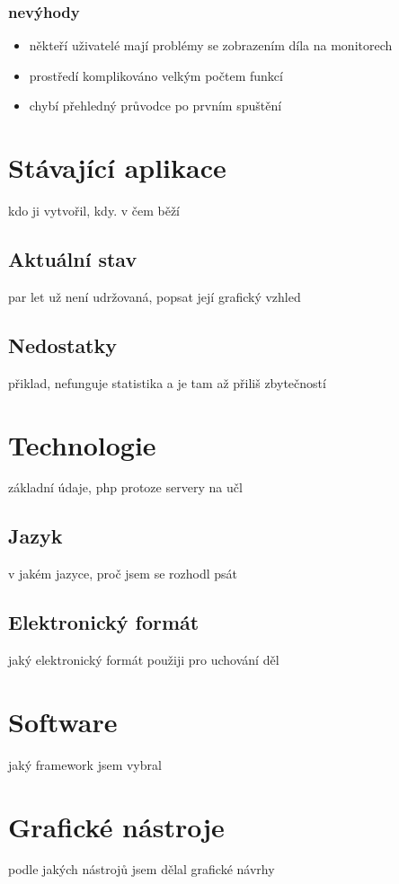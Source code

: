            \subsubsection{nevýhody}
                \begin{itemize}
                    \item někteří uživatelé mají problémy se zobrazením díla na monitorech
                    \item prostředí komplikováno velkým počtem funkcí
                    \item chybí přehledný průvodce po prvním spuštění
                \end{itemize}
    \section{Stávající aplikace}
        kdo ji vytvořil, kdy. v čem běží
        
        \subsection{Aktuální stav}
            par let už není udržovaná, popsat její grafický vzhled
            
        \subsection{Nedostatky}
            přiklad, nefunguje statistika a je tam až přiliš zbytečností
            
    \section{Technologie}
        základní údaje, php protoze servery na učl
        \subsection{Jazyk}
            v jakém jazyce, proč jsem se rozhodl psát
        \subsection{Elektronický formát}
            jaký elektronický formát použiji pro uchování děl
    \section{Software}
        jaký framework jsem vybral
    \section{Grafické nástroje}
        podle jakých nástrojů jsem dělal grafické návrhy

